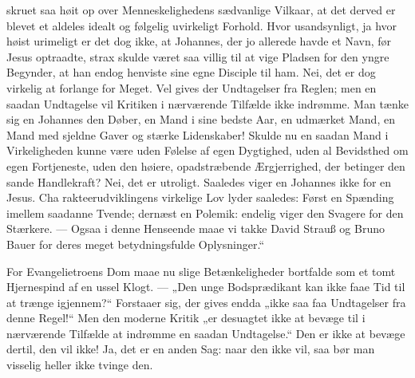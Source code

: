 \documentclass[12pt,a4paper]{book}
\begin{document}
skruet saa høit op over Menneskelighedens sædvanlige Vilkaar, at det derved er
blevet et aldeles idealt og følgelig uvirkeligt Forhold. Hvor usandsynligt, ja
hvor høist urimeligt er det dog ikke, at Johannes, der jo allerede havde et Navn,
før Jesus optraadte, strax skulde været saa villig til at vige Pladsen for den
yngre Begynder, at han endog henviste sine egne Disciple til ham. Nei, det er dog
virkelig at forlange for Meget. Vel gives der Undtagelser fra Reglen; men en
saadan Undtagelse vil Kritiken i nærværende Tilfælde ikke indrømme. Man tænke sig
en Johannes den Døber, en Mand i sine bedste Aar, en udmærket Mand, en Mand med
sjeldne Gaver og stærke Lidenskaber! Skulde nu en saadan Mand i Virkeligheden
kunne være uden Følelse af egen Dygtighed, uden al Bevidsthed om egen
Fortjeneste, uden den høiere, opadstræbende Ærgjerrighed, der betinger den sande
Handlekraft? Nei, det er utroligt. Saaledes viger en Johannes ikke for en Jesus.
Cha\-%
rakteerudviklingens virkelige Lov lyder saaledes: Først en Spænding imellem
saadanne Tvende; dernæst en Polemik: endelig viger den Svagere for den Stærkere.
--- Ogsaa i denne Henseende maae vi takke David Strauß og Bruno Bauer for deres
meget betydningsfulde Oplysninger.“

For Evangelietroens Dom maae nu slige Betænkeligheder bortfalde som et tomt
Hjernespind af en ussel Klogt. --- „Den unge Bodsprædikant kan ikke faae Tid til
at trænge igjennem?“ Forstaaer sig, der gives endda „ikke saa faa Undtagelser fra
denne Regel!“ Men den moderne Kritik „er desuagtet ikke at bevæge til i
nærværende Tilfælde at indrømme en saadan Undtagelse.“ Den er ikke at bevæge
dertil, den vil ikke! Ja, det er en anden Sag: naar den ikke vil, saa bør man
visselig heller ikke tvinge den.
\end{document}
